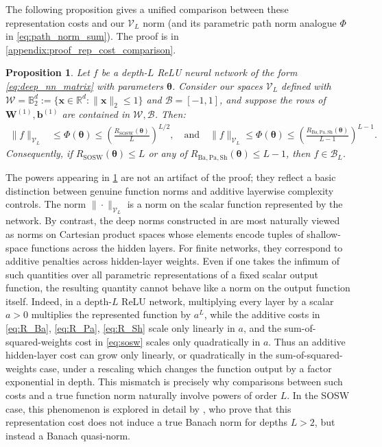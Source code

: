 \documentclass{article}
\def\vtheta{{\bm{\theta}}}
\def\vb{{\bm{b}}}
\def\vx{{\bm{x}}}
\def\mW{{\bm{W}}}
\def\cB{{\mathcal{B}}}
\def\cV{{\mathcal{V}}}
\def\cW{{\mathcal{W}}}
\def\bB{{\mathbb{B}}}
\newcommand{\R}{\mathbb{R}}
\newtheorem{proposition}[theorem]{Proposition}
\begin{document}
The following proposition gives a unified comparison between these representation costs and our $\cV_L$ norm (and its parametric path norm analogue $\Phi$ in \eqref{eq:path_norm_sum}). The proof is in \cref{appendix:proof_rep_cost_comparison}.
\begin{proposition} \label{prop:rep_cost_comparison}
    Let $f$ be a depth-$L$ ReLU neural network of the form \eqref{eq:deep_nn_matrix} with parameters $\vtheta$. Consider our spaces $\cV_L$ defined with $\cW = \bB_2^d := \{ \vx \in \R^d: \| \vx \|_2 \leq 1 \}$ and $\cB = [-1,1]$, and suppose the rows of $\mW^{(1)}, \vb^{(1)}$ are contained in $\cW,\cB$. Then:
    \begin{align}
        \| f \|_{\cV_L} &\leq \Phi (\vtheta) \leq \left( \frac{R_\mathrm{SOSW} (\vtheta)}{L} \right)^{L/2}, \quad \textrm{and} \quad \| f \|_{\cV_L} \leq \Phi (\vtheta) \leq \left( \frac{R_\mathrm{Ba,Pa,Sh} (\vtheta)}{L-1} \right)^{L-1}.
    \end{align}
    Consequently, if $R_{\mathrm{SOSW}} (\vtheta) \leq L$ or any of $R_{\mathrm{Ba},\mathrm{Pa},\mathrm{Sh}} (\vtheta) \leq L-1$, then $f \in \cB_L$.
\end{proposition}

The powers appearing in \cref{prop:rep_cost_comparison} are not an artifact of the proof; they reflect a basic distinction between genuine function norms and additive layerwise complexity controls. The norm $\|\cdot\|_{\mathcal V_L}$ is a norm on the scalar function represented by the network. By contrast, the deep norms constructed in \cite{bartolucci2024neural,parhi2022kinds,shenouda2024variation} are most naturally viewed as norms on Cartesian product spaces whose elements encode tuples of shallow-space functions across the hidden layers. For finite networks, they correspond to additive penalties across hidden-layer weights. Even if one takes the infimum of such quantities over all parametric representations of a fixed scalar output function, the resulting quantity cannot behave like a norm on the output function itself. Indeed, in a depth-$L$ ReLU network, multiplying every layer by a scalar $a>0$ multiplies the represented function by $a^L$, while the additive costs in \eqref{eq:R_Ba}, \eqref{eq:R_Pa}, \eqref{eq:R_Sh} scale only linearly in $a$, and the sum-of-squared-weights cost in \eqref{eq:sosw} scales only quadratically in $a$. Thus an additive hidden-layer cost can grow only linearly, or quadratically in the sum-of-squared-weights case, under a rescaling which changes the function output by a factor exponential in depth. This mismatch is precisely why comparisons between such costs and a true function norm naturally involve powers of order $L$. In the SOSW case, this phenomenon is explored in detail by \cite{ongie2026representation}, who prove that this representation cost does not induce a true Banach norm for depths $L > 2$, but instead a Banach quasi-norm.
\end{document}
